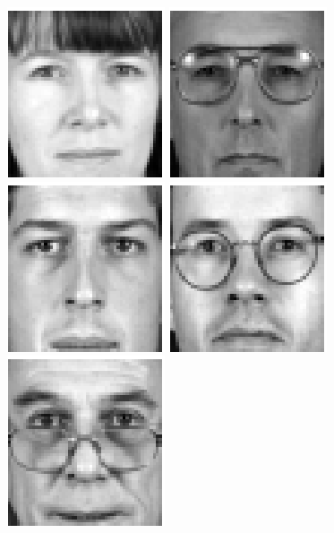 \begin{figure}[ht]
\begin{center}
\includegraphics[scale=0.12]{ch4/figures/XM2VTS_51.png}
\includegraphics[scale=0.12]{ch4/figures/XM2VTS_52.png}
\includegraphics[scale=0.12]{ch4/figures/XM2VTS_53.png}
\includegraphics[scale=0.12]{ch4/figures/XM2VTS_54.png}
\includegraphics[scale=0.12]{ch4/figures/XM2VTS_55.png}

\end{center}
\end{figure}
